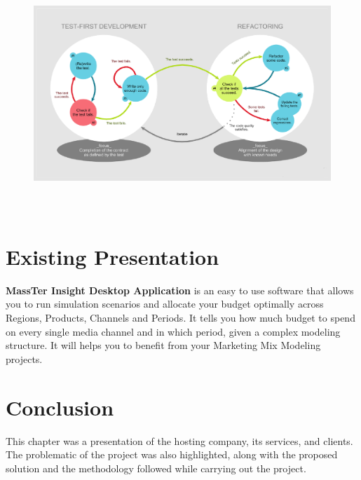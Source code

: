 		\begin{figure}[h]
		\centering
		\includegraphics[width=15cm,height=9cm]{TDD_Global_Lifecycle.png}
		\label{TDD_Global_Lifecycle}
	\end{figure}   
	\section{Existing Presentation}
	\textbf{MassTer Insight Desktop Application} is an easy to use software that allows you to run simulation scenarios and allocate your budget optimally across Regions, Products, Channels and Periods. It tells you how much budget to spend on every single media channel and in which period, given a complex modeling structure. It will helps you to benefit from your Marketing Mix Modeling projects. 

	\section{Conclusion}
	This chapter was a presentation of the hosting company, its services, and clients. The problematic of the project was also highlighted, along with the proposed solution and the methodology followed while carrying out the project.

	

